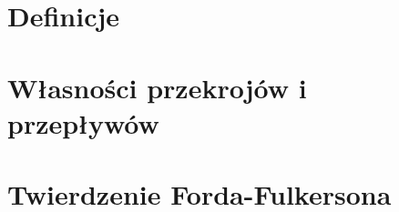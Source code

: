 \section{Definicje}


\section{Własności przekrojów i przepływów}


\section{Twierdzenie Forda-Fulkersona}

